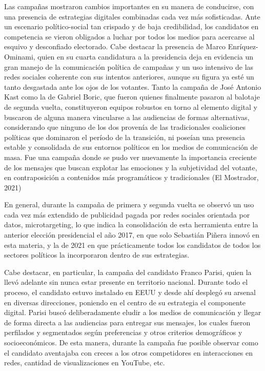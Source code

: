 \documentclass[
  10pt,
  letterpaper,
]{report}
\begin{document}
Las campañas mostraron cambios importantes en su manera de conducirse,
con una presencia de estrategias digitales combinadas cada vez más
sofisticadas. Ante un escenario político-social tan crispado y de baja
credibilidad, los candidatos en competencia se vieron obligados a luchar
por todos los medios para acercarse al esquivo y desconfiado electorado.
Cabe destacar la presencia de Marco Enríquez-Ominami, quien en su cuarta
candidatura a la presidencia deja en evidencia un gran manejo de la
comunicación política de campañas y un uso intensivo de las redes
sociales coherente con sus intentos anteriores, aunque su figura ya esté
un tanto desgastada ante los ojos de los votantes. Tanto la campaña de
José Antonio Kast como la de Gabriel Boric, que fueron quienes
finalmente pasaron al balotaje de segunda vuelta, constituyeron equipos
robustos en torno al elemento digital y buscaron de alguna manera
vincularse a las audiencias de formas alternativas, considerando que
ninguno de los dos provenía de las tradicionales coaliciones políticas
que dominaron el período de la transición, ni poseían una presencia
estable y consolidada de sus entornos políticos en los medios de
comunicación de masa. Fue una campaña donde se pudo ver nuevamente la
importancia creciente de los mensajes que buscan explotar las emociones
y la subjetividad del votante, en contraposición a contenidos más
programáticos y tradicionales (El Mostrador, 2021)

En general, durante la campaña de primera y segunda vuelta se observó un
uso cada vez más extendido de publicidad pagada por redes sociales
orientada por datos, microtargeting, lo que indica la consolidación de
esta herramienta entre la anterior elección presidencial el año 2017, en
que solo Sebastián Piñera innovó en esta materia, y la de 2021 en que
prácticamente todos los candidatos de todos los sectores políticos la
incorporaron dentro de sus estrategias.

Cabe destacar, en particular, la campaña del candidato Franco Parisi,
quien la llevó adelante sin nunca estar presente en territorio nacional.
Durante todo el proceso, el candidato estuvo instalado en EEUU y desde
ahí desplegó su arsenal en diversas direcciones, poniendo en el centro
de su estrategia el componente digital. Parisi buscó deliberadamente
eludir a los medios de comunicación y llegar de forma directa a las
audiencias para entregar sus mensajes, los cuales fueron perfilados y
segmentados según preferencias y otros criterios demográficos y
socioeconómicos. De esta manera, durante la campaña fue posible observar
como el candidato aventajaba con creces a los otros competidores en
interacciones en redes, cantidad de visualizaciones en YouTube, etc.
\end{document}
